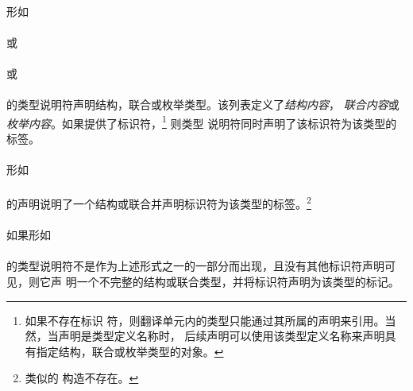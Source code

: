 {\paragraph{}
形如                                                                          \\
\mbox{\hspace{4em} \tm{\{}
   \tm{\}}}                                       \\
或                                                                            \\
\mbox{\hspace{4em}  \tm{\{}
   \tm{\}}}                                               \\
或                                                                            \\
\mbox{\hspace{4em}  \tm{\{}
   \tm{, \}}}                                             \\
的类型说明符声明结构，联合或枚举类型。该列表定义了\textit{结构内容}，
\textit{联合内容}或\textit{枚举内容}。如果提供了标识符，\footnote{如果不存在标识
符，则翻译单元内的类型只能通过其所属的声明来引用。当然，当声明是类型定义名称时，
后续声明可以使用该类型定义名称来声明具有指定结构，联合或枚举类型的对象。} 则类型
说明符同时声明了该标识符为该类型的标签。

\paragraph{}
形如                                                                          \\
\mbox{\hspace{4em} \tm{;}}                     \\
的声明说明了一个结构或联合并声明标识符为该类型的标签。\footnote{类似的
构造不存在。\label{no-enum}}

\paragraph{}
如果形如                                                                      \\
\mbox{\hspace{4em}}                            \\
的类型说明符不是作为上述形式之一的一部分而出现，且没有其他标识符声明可见，则它声
明一个不完整的结构或联合类型，并将标识符声明为该类型的标记。\tsup{\ref{no-enum}}

}
